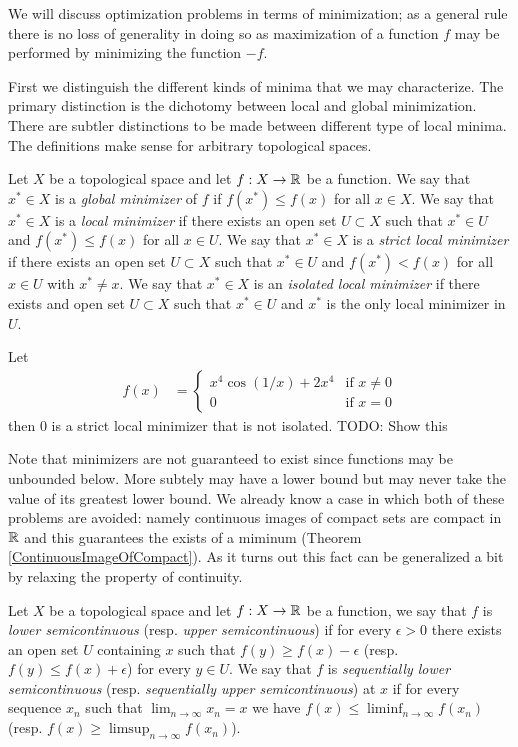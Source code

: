 We will discuss optimization problems in terms of minimization; as a
general rule there is no loss of generality in doing so as
maximization of a function $f$ may be performed by minimizing the
function $-f$.  

First we distinguish the different kinds of minima that we may
characterize.  The primary distinction is the dichotomy between local
and global minimization.  There are subtler distinctions to be made
between different type of local minima.  The definitions make sense
for arbitrary topological spaces.

\begin{defn}Let $X$ be a topological space and let $f : X \to \mathbb{R}$
  be a function.  We say that $x^* \in X$ is a \emph{global minimizer}
  of $f$ if $f(x^*) \leq f(x)$ for all $x \in X$.  We say that $x^*
  \in X$ is a \emph{local minimizer} if there exists an open set $U
  \subset X$ such that $x^* \in U$ and $f(x^*) \leq f(x)$ for all $x
  \in U$.  We say that $x^*
  \in X$ is a \emph{strict local minimizer} if there exists an open set $U
  \subset X$ such that $x^* \in U$ and $f(x^*) < f(x)$ for all $x
  \in U$ with $x^* \neq x$.  We say that $x^* \in X$ is an
  \emph{isolated local minimizer} if there exists and open set $U
  \subset X$ such that $x^* \in U$ and $x^*$ is the only local
  minimizer in $U$.
\end{defn}

\begin{examp}Let 
\begin{align*}
f(x) &= \begin{cases}
x^4 \cos(1/x) + 2x^4 & \text{if $x \neq 0$} \\
0 & \text{if $x = 0$}
\end{cases}
\end{align*}
then $0$ is a strict local minimizer that is not isolated.  TODO: Show this
\end{examp}

Note that minimizers are not guaranteed to exist since functions may
be unbounded below.  More subtely may have a lower bound but may never
take the value of its greatest lower bound.  We already know a case in
which both of these problems are avoided: namely continuous images of
compact sets are compact in $\mathbb{R}$ and this guarantees the exists of
a miminum (Theorem \ref{ContinuousImageOfCompact}).  As it turns out
this fact can be generalized a bit by relaxing the property of
continuity.

\begin{defn}Let $X$ be a topological space and let $f : X \to \mathbb{R}$
  be a function, we say that $f$ is \emph{lower semicontinuous}
  (resp. \emph{upper semicontinuous}) if for every
  $\epsilon > 0$ there exists an open set $U$ containing $x$ such that
  $f(y) \geq f(x) - \epsilon$ (resp. $f(y) \leq f(x) + \epsilon$) for
  every $y \in U$. We say that $f$ is \emph{sequentially lower
    semicontinuous} (resp. \emph{sequentially upper semicontinuous})
  at $x$ if for every sequence $x_n$ such that $\lim_{n \to \infty}
  x_n = x$ we have $f(x) \leq \liminf_{n \to \infty} f(x_n)$ (resp. $f(x) \geq \limsup_{n \to \infty} f(x_n)$).
\end{defn}

